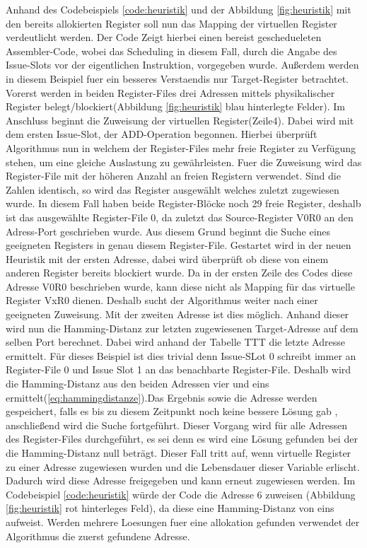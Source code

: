 Anhand des Codebeispiels \ref{code:heuristik} und der Abbildung \ref{fig:heuristik} mit den bereits allokierten Register soll nun das Mapping der virtuellen Register verdeutlicht werden.
Der Code Zeigt hierbei einen bereist geschedueleten Assembler-Code, wobei das Scheduling in diesem Fall, durch die Angabe des Issue-Slots vor der eigentlichen Instruktion, vorgegeben wurde. Außerdem werden in diesem Beispiel fuer ein besseres Verstaendis nur Target-Register betrachtet.
Vorerst werden in beiden Register-Files drei Adressen mittels physikalischer Register belegt/blockiert(Abbildung \ref{fig:heuristik} blau hinterlegte Felder). Im Anschluss beginnt die Zuweisung der virtuellen Register(Zeile4).
Dabei wird mit dem ersten Issue-Slot, der ADD-Operation begonnen. Hierbei  überprüft Algorithmus nun in welchem der Register-Files mehr freie Register zu Verfügung stehen, um eine gleiche Auslastung zu gewährleisten. Fuer die Zuweisung wird das Register-File mit der höheren Anzahl an freien Registern verwendet. Sind die Zahlen identisch, so wird das Register ausgewählt welches zuletzt zugewiesen wurde. In diesem Fall haben beide Register-Blöcke noch 29 freie Register, deshalb ist das ausgewählte Register-File 0, da zuletzt das Source-Register V0R0 an den Adress-Port geschrieben wurde.
Aus diesem Grund beginnt die Suche eines geeigneten Registers in genau diesem Register-File. Gestartet wird in der neuen Heuristik mit der ersten Adresse, dabei wird überprüft ob diese von einem anderen Register bereits blockiert wurde. Da in der ersten Zeile des Codes diese Adresse V0R0 beschrieben wurde, kann diese nicht als Mapping für das virtuelle Register VxR0 dienen. Deshalb sucht der Algorithmus weiter nach einer geeigneten Zuweisung. Mit der zweiten Adresse ist dies möglich. Anhand dieser wird nun die Hamming-Distanz zur letzten zugewiesenen Target-Adresse auf dem selben Port berechnet. Dabei wird anhand der Tabelle TTT die letzte Adresse ermittelt. Für dieses Beispiel ist dies trivial denn Issue-SLot 0 schreibt immer an Register-File 0 und Issue Slot 1 an das benachbarte Register-File. Deshalb wird die Hamming-Distanz aus den beiden Adressen vier und eins ermittelt(\ref{eq:hammingdistanze}).Das Ergebnis sowie die Adresse werden gespeichert, falls es bis zu diesem Zeitpunkt noch keine bessere Lösung gab , anschließend wird die Suche fortgeführt. Dieser Vorgang wird für alle Adressen des Register-Files durchgeführt, es sei denn es wird eine Lösung gefunden bei der die Hamming-Distanz null beträgt. Dieser Fall tritt auf, wenn virtuelle Register zu einer Adresse zugewiesen wurden und die Lebensdauer dieser Variable erlischt. Dadurch wird diese Adresse freigegeben und kann erneut zugewiesen werden. Im Codebeispiel \ref{code:heuristik} würde der Code die Adresse 6 zuweisen (Abbildung \ref{fig:heuristik} rot hinterleges Feld), da diese eine Hamming-Distanz von eins aufweist. Werden mehrere Loesungen fuer eine allokation gefunden verwendet der Algorithmus die zuerst gefundene Adresse.

